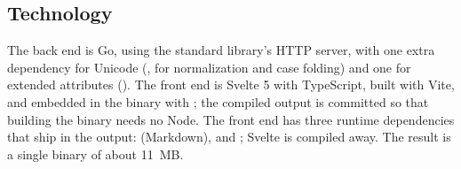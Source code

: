 \subsection{Technology}

The back end is Go, using the standard library's HTTP server, with one extra
dependency for Unicode (, for normalization and case
folding) and one for extended attributes ().  The front end
is Svelte 5 with TypeScript, built with Vite, and embedded in the binary with
; the compiled output is committed so that building the binary needs
no Node.  The front end has three runtime dependencies that ship in the output:
 (Markdown),  and ; Svelte is compiled away.
The result is a single binary of about 11~MB.
